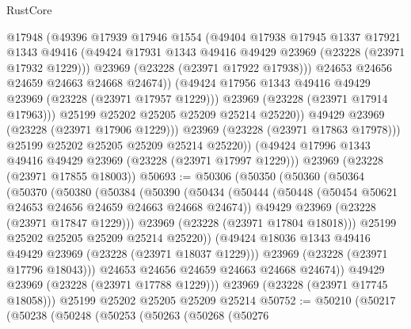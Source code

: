 \begin{lexlean}{RustCore}
\begin{coremodule}
                    @17948
                    (@49396
                      @17939
                      @17946
                      @1554
                      (@49404
                        @17938
                        @17945
                        @1337
                        @17921
                        @1343
                        @49416
                        (@49424 @17931 @1343 @49416 @49429 @23969 (@23228 (@23971 @17932 @1229)))
                        @23969
                        (@23228 (@23971 @17922 @17938)))
                      @24653
                      @24656
                      @24659
                      @24663
                      @24668
                      @24674))
                  (@49424 @17956 @1343 @49416 @49429 @23969 (@23228 (@23971 @17957 @1229)))
                  @23969
                  (@23228 (@23971 @17914 @17963)))
                @25199
                @25202
                @25205
                @25209
                @25214
                @25220))
            @49429
            @23969
            (@23228 (@23971 @17906 @1229)))
          @23969
          (@23228 (@23971 @17863 @17978)))
        @25199
        @25202
        @25205
        @25209
        @25214
        @25220))
    (@49424 @17996 @1343 @49416 @49429 @23969 (@23228 (@23971 @17997 @1229)))
    @23969
    (@23228 (@23971 @17855 @18003))
@50693 := @50306
    (@50350
      (@50360
        (@50364
          (@50370
            (@50380
              (@50384
                (@50390
                  (@50434
                    (@50444
                      (@50448 (@50454 @50621 @24653 @24656 @24659 @24663 @24668 @24674))
                      @49429
                      @23969
                      (@23228 (@23971 @17847 @1229)))
                    @23969
                    (@23228 (@23971 @17804 @18018)))
                  @25199
                  @25202
                  @25205
                  @25209
                  @25214
                  @25220))
              (@49424 @18036 @1343 @49416 @49429 @23969 (@23228 (@23971 @18037 @1229)))
              @23969
              (@23228 (@23971 @17796 @18043)))
            @24653
            @24656
            @24659
            @24663
            @24668
            @24674))
        @49429
        @23969
        (@23228 (@23971 @17788 @1229)))
      @23969
      (@23228 (@23971 @17745 @18058)))
    @25199
    @25202
    @25205
    @25209
    @25214
@50752 := @50210
    (@50217
      (@50238
        (@50248
          (@50253
            (@50263
              (@50268
                (@50276

\end{coremodule}
\end{lexlean}
